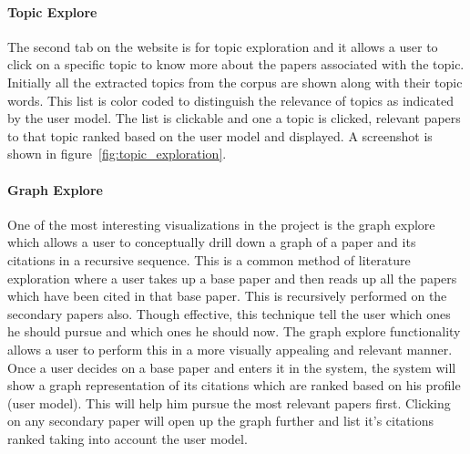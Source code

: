 \paragraph{Topic Explore} The second tab on the website is for topic exploration and it allows a user to click on a specific topic to know more about the papers associated with the topic. Initially all the extracted topics from the corpus are shown along with their topic words. This list is color coded to distinguish the relevance of topics as indicated by the user model. The list is clickable and one a topic is clicked, relevant papers to that topic ranked based on the user model and displayed.
A screenshot is shown in figure~\ref{fig:topic_exploration}.



\paragraph{Graph Explore} One of the most interesting visualizations in the project is the graph explore which allows a user to conceptually drill down a graph of a paper and its citations in a recursive sequence. This is a common method of literature exploration where a user takes up a base paper and then reads up all the papers which have been cited in that base paper. This is recursively performed on the secondary papers also. Though effective, this technique tell the user which ones he should pursue and which ones he should now. The graph explore functionality allows a user to perform this in a more visually appealing and relevant manner. Once a user decides on a base paper and enters it in the system, the system will show a graph representation of its citations which are ranked based on his profile (user model). This will help him pursue the most relevant papers first. Clicking on any secondary paper will open up the graph further and list it's citations ranked taking into account the user model.
